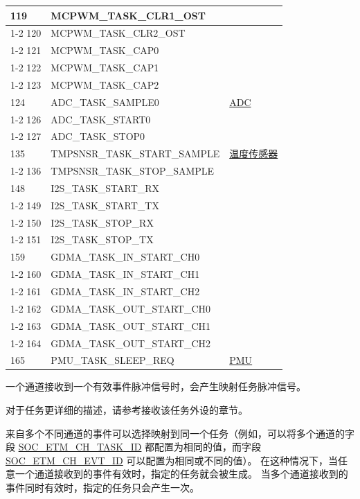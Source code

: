 \documentclass[main\_\_CN.tex]{subfiles}
\begin{document}
\begin{longtable}{ | l | l | l | }
119 & MCPWM\_TASK\_CLR1\_OST & \\ \cline{1-2}
120 & MCPWM\_TASK\_CLR2\_OST & \\ \cline{1-2}
121 & MCPWM\_TASK\_CAP0      & \\ \cline{1-2}
122 & MCPWM\_TASK\_CAP1      & \\ \cline{1-2}
123 & MCPWM\_TASK\_CAP2      & \\ \hline
124 & ADC\_TASK\_SAMPLE0     & \hyperref[mod:adc]{ADC}   \\ \cline{1-2}
126 & ADC\_TASK\_START0      & \\ \cline{1-2}
127 & ADC\_TASK\_STOP0& \\ \hline
135 & TMPSNSR\_TASK\_START\_SAMPLE  & \hyperref[mod:tmpsen]{温度传感器}      \\ \cline{1-2}
136 & TMPSNSR\_TASK\_STOP\_SAMPLE   & \\ \hline
148 & I2S\_TASK\_START\_RX   & \nameref{mod:i2s}   \\ \cline{1-2}
149 & I2S\_TASK\_START\_TX   & \\ \cline{1-2}
150 & I2S\_TASK\_STOP\_RX    & \\ \cline{1-2}
151 & I2S\_TASK\_STOP\_TX    & \\ \hline
159 & GDMA\_TASK\_IN\_START\_CH0    & \nameref{mod:dma}  \\ \cline{1-2}
160 & GDMA\_TASK\_IN\_START\_CH1    & \\ \cline{1-2}
161 & GDMA\_TASK\_IN\_START\_CH2    & \\ \cline{1-2}
162 & GDMA\_TASK\_OUT\_START\_CH0   & \\ \cline{1-2}
163 & GDMA\_TASK\_OUT\_START\_CH1   & \\ \cline{1-2}
164 & GDMA\_TASK\_OUT\_START\_CH2   & \\ \hline
165 & PMU\_TASK\_SLEEP\_REQ  & \hyperref[mod:lowpowm]{PMU} \\ \hline
\end{longtable}

一个通道接收到一个有效事件脉冲信号时，会产生映射任务脉冲信号。

对于任务更详细的描述，请参考接收该任务外设的章节。

来自多个不同通道的事件可以选择映射到同一个任务（例如，可以将多个通道的字段 \hyperref[fielddesc:SOCETMCH0TASKID]{SOC\_ETM\_CH\_TASK\_ID} 都配置为相同的值，而字段 \hyperref[fielddesc:SOCETMCH0EVTID]{SOC\_ETM\_CH\_EVT\_ID} 可以配置为相同或不同的值）。 在这种情况下，当任意一个通道接收到的事件有效时，指定的任务就会被生成。 当多个通道接收到的事件同时有效时，指定的任务只会产生一次。
\end{document}
